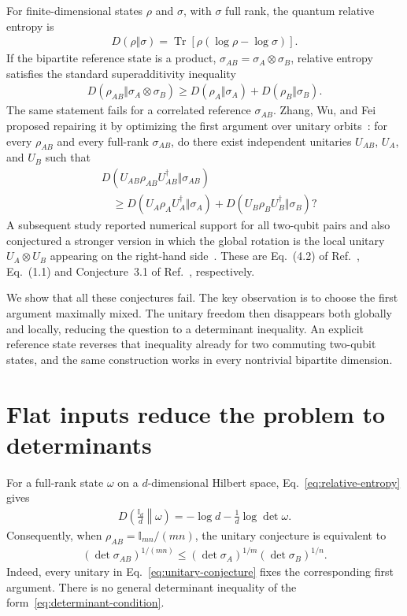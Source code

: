 \documentclass[
  aps,
  pra,
  reprint,
  superscriptaddress,
  nofootinbib,
  longbibliography
]{revtex4-2}
\theoremstyle{remark}
\newcommand{\identity}{\mathbb{I}}
\newcommand{\tr}{\operatorname{Tr}}
\begin{document}
For finite-dimensional states $\rho$ and $\sigma$, with $\sigma$ full rank,
the quantum relative entropy is
\begin{align}
 D(\rho\Vert\sigma)
 =\tr\!\left[\rho(\log\rho-\log\sigma)\right].
 \label{eq:relative-entropy}
\end{align}
If the bipartite reference state is a product,
$\sigma_{AB}=\sigma_A\otimes\sigma_B$, relative entropy satisfies the
standard superadditivity inequality
\begin{align}
 D(\rho_{AB}\Vert\sigma_A\otimes\sigma_B)
 \geq D(\rho_A\Vert\sigma_A)+D(\rho_B\Vert\sigma_B).
 \label{eq:product-superadditivity}
\end{align}
The same statement fails for a correlated reference $\sigma_{AB}$.
Zhang, Wu, and Fei proposed repairing it by optimizing the first argument
over unitary orbits~\cite{ZhangWuFei2013}: for every $\rho_{AB}$ and every
full-rank $\sigma_{AB}$, do there exist independent unitaries
$U_{AB}$, $U_A$, and $U_B$ such that
\begin{align}
 &D(U_{AB}\rho_{AB}U_{AB}^{\dagger}\Vert\sigma_{AB})
 \nonumber\\
 &\quad\geq
 D(U_A\rho_AU_A^{\dagger}\Vert\sigma_A)
 +D(U_B\rho_BU_B^{\dagger}\Vert\sigma_B)?
 \label{eq:unitary-conjecture}
\end{align}
A subsequent study reported numerical support for all two-qubit pairs and
also conjectured a stronger version in which the global rotation is the
local unitary $U_A\otimes U_B$ appearing on the right-hand
side~\cite{ZhangHeTao2014}.  These are Eq.~(4.2) of
Ref.~\cite{ZhangWuFei2013}, Eq.~(1.1) and Conjecture~3.1 of
Ref.~\cite{ZhangHeTao2014}, respectively.

We show that all these conjectures fail.  The key observation is to choose
the first argument maximally mixed.  The unitary freedom then disappears
both globally and locally, reducing the question to a determinant
inequality.  An explicit reference state reverses that inequality already
for two commuting two-qubit states, and the same construction works in every
nontrivial bipartite dimension.

\section{Flat inputs reduce the problem to determinants}

For a full-rank state $\omega$ on a $d$-dimensional Hilbert space,
Eq.~\eqref{eq:relative-entropy} gives
\begin{align}
 D\!\left(\frac{\identity_d}{d}\middle\Vert\omega\right)
 =-\log d-\frac{1}{d}\log\det\omega.
 \label{eq:flat-relative-entropy}
\end{align}
Consequently, when $\rho_{AB}=\identity_{mn}/(mn)$, the unitary conjecture
is equivalent to
\begin{align}
 (\det\sigma_{AB})^{1/(mn)}
 \leq (\det\sigma_A)^{1/m}(\det\sigma_B)^{1/n}.
 \label{eq:determinant-condition}
\end{align}
Indeed, every unitary in Eq.~\eqref{eq:unitary-conjecture} fixes the
corresponding first argument.  There is no general determinant inequality
of the form~\eqref{eq:determinant-condition}.
\end{document}

